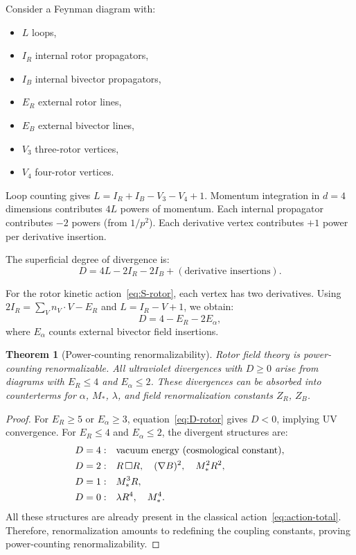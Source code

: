 \documentclass[11pt,a4paper]{article}
\numberwithin{equation}{section}
\theoremstyle{plain}
\newtheorem{theorem}{Theorem}[section]
\theoremstyle{definition}
\theoremstyle{remark}
\begin{document}
Consider a Feynman diagram with:
\begin{itemize}
  \item $L$ loops,
  \item $I_R$ internal rotor propagators,
  \item $I_B$ internal bivector propagators,
  \item $E_R$ external rotor lines,
  \item $E_B$ external bivector lines,
  \item $V_3$ three-rotor vertices,
  \item $V_4$ four-rotor vertices.
\end{itemize}

Loop counting gives $L = I_R + I_B - V_3 - V_4 + 1$. Momentum integration in $d=4$ dimensions contributes $4L$ powers of momentum. Each internal propagator contributes $-2$ powers (from $1/p^2$). Each derivative vertex contributes $+1$ power per derivative insertion.

The superficial degree of divergence is:
\begin{equation}
D = 4L - 2I_R - 2I_B + (\text{derivative insertions}).
\label{eq:D-general}
\end{equation}

For the rotor kinetic action~\eqref{eq:S-rotor}, each vertex has two derivatives. Using $2I_R = \sum_V n_V \cdot V - E_R$ and $L=I_R-V+1$, we obtain:
\begin{equation}
D = 4 - E_R - 2E_\alpha,
\label{eq:D-rotor}
\end{equation}
where $E_\alpha$ counts external bivector field insertions.

\begin{theorem}[Power-counting renormalizability]
Rotor field theory is power-counting renormalizable. All ultraviolet divergences with $D\geq 0$ arise from diagrams with $E_R\leq 4$ and $E_\alpha\leq 2$. These divergences can be absorbed into counterterms for $\alpha$, $M_*$, $\lambda$, and field renormalization constants $Z_R$, $Z_B$.
\end{theorem}

\begin{proof}
For $E_R\geq 5$ or $E_\alpha\geq 3$, equation~\eqref{eq:D-rotor} gives $D<0$, implying UV convergence. For $E_R\leq 4$ and $E_\alpha\leq 2$, the divergent structures are:
\begin{align}
D=4: &\quad \text{vacuum energy (cosmological constant)}, \notag\\
D=2: &\quad R\,\Box R,\quad (\nabla B)^2,\quad M_*^2 R^2, \notag\\
D=1: &\quad M_*^3 R, \notag\\
D=0: &\quad \lambda R^4,\quad M_*^4. \notag
\end{align}
All these structures are already present in the classical action~\eqref{eq:action-total}. Therefore, renormalization amounts to redefining the coupling constants, proving power-counting renormalizability.
\end{proof}
\end{document}
